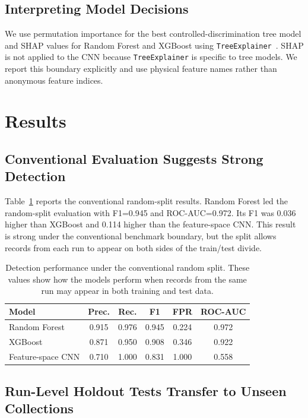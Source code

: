 \documentclass[conference,a4paper]{IEEEtran}
\begin{document}
\subsection{Interpreting Model Decisions}

We use permutation importance for the best controlled-discrimination tree model and SHAP values for Random Forest and XGBoost using \texttt{TreeExplainer}~\cite{lundberg2017shap}. SHAP is not applied to the CNN because \texttt{TreeExplainer} is specific to tree models. We report this boundary explicitly and use physical feature names rather than anonymous feature indices.

\section{Results}

\subsection{Conventional Evaluation Suggests Strong Detection}

Table~\ref{tab:naive} reports the conventional random-split results. Random Forest led the random-split evaluation with F1=0.945 and ROC-AUC=0.972. Its F1 was 0.036 higher than XGBoost and 0.114 higher than the feature-space CNN. This result is strong under the conventional benchmark boundary, but the split allows records from each run to appear on both sides of the train/test divide.

\begin{table}[htbp]
\caption{Detection performance under the conventional random split. These values show how the models perform when records from the same run may appear in both training and test data.}
\label{tab:naive}
\centering
\scriptsize
\begin{tabular}{lccccc}
\toprule
\textbf{Model} & \textbf{Prec.} & \textbf{Rec.} & \textbf{F1} & \textbf{FPR} & \textbf{ROC-AUC} \\
\midrule
Random Forest & 0.915 & 0.976 & 0.945 & 0.224 & 0.972 \\
XGBoost & 0.871 & 0.950 & 0.908 & 0.346 & 0.922 \\
Feature-space CNN & 0.710 & 1.000 & 0.831 & 1.000 & 0.558 \\
\bottomrule
\end{tabular}
\end{table}
\FloatBarrier

\subsection{Run-Level Holdout Tests Transfer to Unseen Collections}
\end{document}
